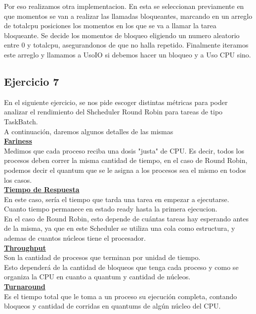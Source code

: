 Por eso realizamos otra implementacion. En esta se seleccionan previamente en que momentos se van a realizar las llamadas bloqueantes, marcando en un arreglo de totalcpu posiciones los momentos en los que se va
a llamar la tarea bloqueante. Se decide los momentos de bloqueo eligiendo un numero aleatorio entre 0 y totalcpu, asegurandonos de que no halla repetido. 
Finalmente iteramos este arreglo y llamamos a UsoIO si debemos hacer un bloqueo y a Uso CPU sino.


\subsection{Ejercicio 7}
En el siguiente ejercicio, se nos pide escoger distintas m\'etricas para poder analizar el rendimiento del Shcheduler Round Robin para tareas de tipo TaskBatch.\\
A continuaci\'on, daremos algunos detalles de las mismas\\

\textbf{\underline{Fariness}}\\
Medimos que cada proceso reciba una dosis "justa" de CPU. Es decir, todos los procesos deben correr la misma cantidad de tiempo, en el caso de Round Robin, podemos decir el quantum que se le asigna a los procesos sea el mismo en todos los casos.\\

\textbf{\underline{Tiempo de Respuesta}}\\
En este caso, ser\'ia el tiempo que tarda una tarea en empezar a ejecutarse.
Cuanto tiempo permanece en estado ready hasta la primera ejecucion.\\
En el caso de Round Robin, esto depende de cu\'antas tareas hay esperando antes de la misma, ya que en este Scheduler se utiliza una cola como estructura, y ademas de cuantos n\'ucleos tiene el procesador.\\

\textbf{\underline{Throughput}}\\
Son la cantidad de procesos que terminan por unidad de tiempo.\\
Esto depender\'a de la cantidad de bloqueos que tenga cada proceso y como se organiza la CPU en cuanto a quantum y cantidad de n\'ucleos.\\

\textbf{\underline{Turnaround}}\\
Es el tiempo total que le toma a un proceso su ejecuci\'on completa, contando bloqueos y cantidad de corridas en quantums de alg\'un n\'ucleo del CPU.\\

